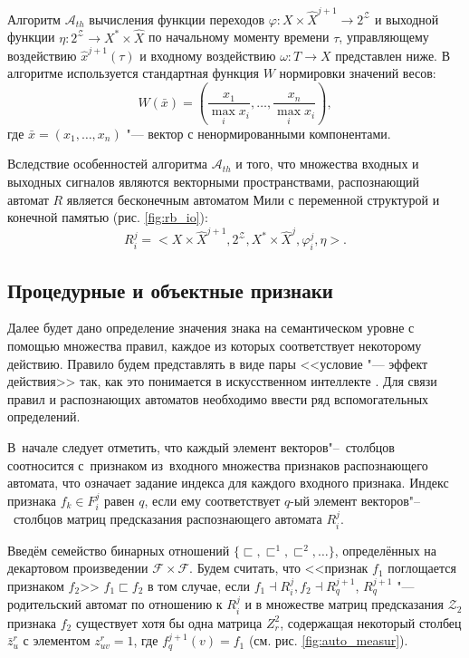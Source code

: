 \documentclass[a4paper, 12pt]{article}
\theoremstyle{plain}
\begin{document}
	Алгоритм $\mathcal A_{th}$ вычисления функции переходов $\varphi:X\times\hat X^{j+1}\to 2^{\mathcal Z}$ и выходной функции $\eta:2^{\mathcal Z}\to X^*\times\hat X$ по начальному моменту времени $\tau$, управляющему воздействию $\hat x^{j+1}(\tau)$ и входному воздействию $\omega:T\to X$ представлен ниже. В алгоритме используется стандартная функция $W$ нормировки значений весов:
	\begin{equation}
	W(\bar x)=\left(\frac{x_1}{\max\limits_i x_i},\dots,\frac{x_n}{\max\limits_i x_i}\right),
	\end{equation} 
	где $\bar x=(x_1,\dots,x_n)$ "--- вектор с ненормированными компонентами.

	Вследствие особенностей алгоритма $\mathcal A_{th}$ и  того, что множества входных и выходных сигналов являются векторными пространствами, распознающий автомат $R$ является бесконечным автоматом Мили с переменной структурой и конечной памятью (рис. \ref{fig:rb_io}): 
	\begin{equation}
	R_i^j=<X\times\hat X^{j+1}, 2^{\mathcal Z}, X^*\times\hat X^j,\varphi_i^j,\eta>.
	\end{equation}

	\subsection{Процедурные и объектные признаки}
	Далее будет дано определение значения знака на семантическом уровне с помощью множества правил, каждое из которых соответствует некоторому действию. Правило будем представлять в виде пары <<условие "--- эффект действия>> так, как это понимается в искусственном интеллекте \cite{Nilson1985}. Для связи правил и распознающих автоматов необходимо ввести ряд вспомогательных определений. 

	В~начале следует отметить, что каждый элемент векторов"--~столбцов соотносится с~признаком из~входного множества признаков распознающего автомата, что означает задание индекса для каждого входного признака. Индекс признака $f_k\in F_i^j$ равен  $q$, если ему соответствует $q$-ый элемент векторов"--~столбцов матриц предсказания распознающего автомата $R_i^j$. 
	
	Введём семейство бинарных отношений $\{\sqsubset,\sqsubset^1,\sqsubset^2,\dots\}$, определённых на декартовом произведении $\mathcal F\times \mathcal F$. Будем считать, что <<признак $f_1$ поглощается признаком $f_2$>> $f_1\sqsubset f_2$ в том случае, если $f_1\dashv R_i^j, f_2\dashv R_q^{j+1}$, $R_q^{j+1}$ "--- родительский автомат по отношению к $R_i^j$ и в множестве матриц предсказания $\mathcal Z_2$ признака $f_2$ существует хотя бы одна матрица $Z_r^2$, содержащая некоторый столбец $\bar z_u^r$ с элементом $z_{uv}^r=1$, где $f_q^{j+1}(v)=f_1$ (см. рис. \ref{fig:auto_measur}).
		
\end{document}
